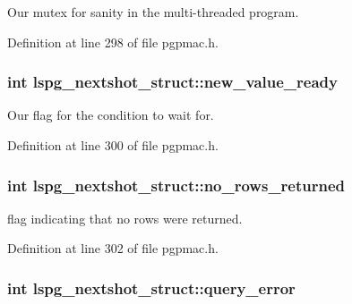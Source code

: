 Our mutex for sanity in the multi-\/threaded program. 



Definition at line 298 of file pgpmac.\-h.

\hypertarget{structlspg__nextshot__struct_adb8da14444b98f556dba9420dd4666dc}{
\subsubsection[{new\-\_\-value\-\_\-ready}]{\setlength{\rightskip}{0pt plus 5cm}int lspg\-\_\-nextshot\-\_\-struct\-::new\-\_\-value\-\_\-ready}}\label{structlspg__nextshot__struct_adb8da14444b98f556dba9420dd4666dc}


Our flag for the condition to wait for. 



Definition at line 300 of file pgpmac.\-h.

\hypertarget{structlspg__nextshot__struct_abc9242805729f70b83df79706c394c71}{
\subsubsection[{no\-\_\-rows\-\_\-returned}]{\setlength{\rightskip}{0pt plus 5cm}int lspg\-\_\-nextshot\-\_\-struct\-::no\-\_\-rows\-\_\-returned}}\label{structlspg__nextshot__struct_abc9242805729f70b83df79706c394c71}


flag indicating that no rows were returned. 



Definition at line 302 of file pgpmac.\-h.

\hypertarget{structlspg__nextshot__struct_aa50fbe34bd93ccc3762a804e95f8fd10}{
\subsubsection[{query\-\_\-error}]{\setlength{\rightskip}{0pt plus 5cm}int lspg\-\_\-nextshot\-\_\-struct\-::query\-\_\-error}}\label{structlspg__nextshot__struct_aa50fbe34bd93ccc3762a804e95f8fd10}


